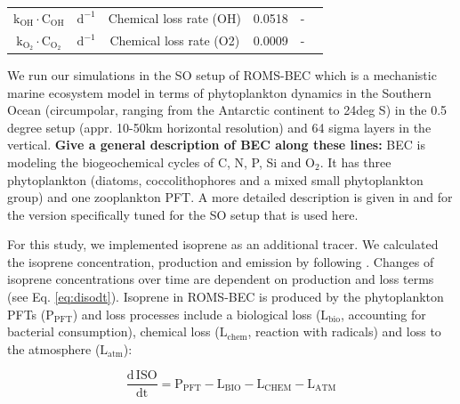 \documentclass[draft,linenumbers]{agujournal}
\begin{document}
\begin{center}
\begin{table}[h!]
\begin{tabular}[ht]{ c|c|c|c|c|c }
$\mathrm{k}_{\mathrm{OH}} \cdot \mathrm{C}_{\mathrm{OH}}$ & $\mathrm{d}^{\mathrm{-1}}$ & \tiny{Chemical loss rate (OH) } & 0.0518 & - & \citet{booge2016can} \\

$\mathrm{k}_{\mathrm{O_{\mathrm{2}}}} \cdot \mathrm{C}_{\mathrm{O_{\mathrm{2}}}}$ & $\mathrm{d}^{\mathrm{-1}}$ & \tiny{Chemical loss rate (O2)} & 0.0009 & - & \citet{booge2016can} \\

\end{tabular}

\end{table}

\end{center}

We run our simulations in the SO setup of ROMS-BEC \citep{Haumann2016,Nissen2018} which is a mechanistic marine ecosystem model in terms of phytoplankton dynamics in the Southern Ocean (circumpolar, ranging from the Antarctic continent to 24deg S) in the 0.5 degree setup (appr. 10-50km horizontal resolution) and 64 sigma layers in the vertical.
\textbf{Give a general description of BEC along these lines: } BEC is modeling the biogeochemical cycles of C, N, P, Si and O$_{2}$. It has three phytoplankton (diatoms, coccolithophores and a mixed small phytoplankton group) and one zooplankton PFT. A more detailed description is given in \citet{Moore2013} and \citet{Nissen2018} for the version specifically tuned for the SO setup that is used here. 

For this study, we implemented isoprene as an additional tracer. We calculated the isoprene concentration, production and emission by following \citet{palmer2005quantifying, booge2016can}. 
Changes of isoprene concentrations over time are dependent on production and loss terms (see Eq. \ref{eq:disodt}).
Isoprene in ROMS-BEC is produced by the phytoplankton PFTs ($\mathrm{P}_{\mathrm{PFT}}$) and loss processes include a biological loss ($\mathrm{L}_{\mathrm{bio}}$, accounting for bacterial consumption), chemical loss ($\mathrm{L}_{\mathrm{chem}}$, reaction with radicals) and loss to the atmosphere ($\mathrm{L}_{\mathrm{atm}}$):

\begin{linenomath*}
\begin{equation}
\frac{\mathrm{d \, ISO}}{\mathrm{dt}} = \mathrm{P}_{\mathrm{PFT}} - \mathrm{L}_{\mathrm{BIO}} - \mathrm{L}_{\mathrm{CHEM}} - \mathrm{L}_{\mathrm{ATM}}
\label{eq:disodt}
\end{equation}
\end{linenomath*}
\end{document}
